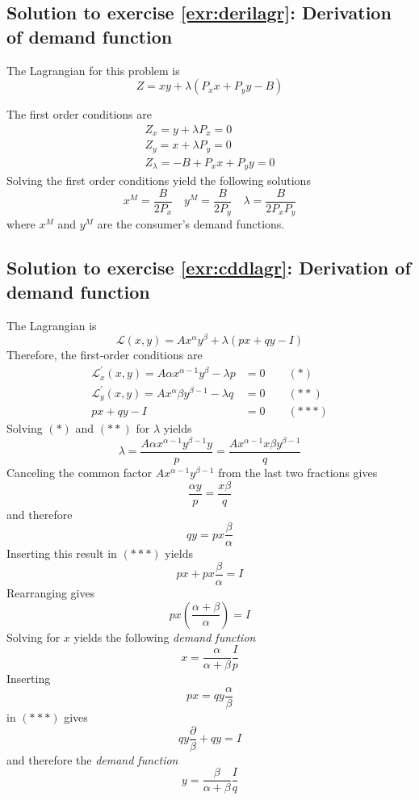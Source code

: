 \documentclass[
  12pt,
  oneside]{book}
\theoremstyle{definition}
\theoremstyle{definition}
\theoremstyle{definition}
\theoremstyle{definition}
\theoremstyle{remark}
\begin{document}
\hypertarget{sol:derilagr}{%
\subsection*{Solution to exercise \ref{exr:derilagr}: Derivation of demand function}\label{sol:derilagr}}

The Lagrangian for this problem is
\[
Z=x y+\lambda\left(P_{x} x+P_{y} y-B\right)
\]

The first order conditions are
\[\begin{array}{l}
        Z_{x}=y+\lambda P_{x}=0 \\
        Z_{y}=x+\lambda P_{y}=0 \\
        Z_{\lambda}=-B+P_{x} x+P_{y} y=0
    \end{array}
\]
Solving the first order conditions yield the following solutions
\[
    x^{M}=\frac{B}{2 P_{x}} \quad y^{M}=\frac{B}{2 P_{y}} \quad \lambda=\frac{B}{2 P_{x} P_{y}}
\]
where \(x^{M}\) and \(y^{M}\) are the consumer's demand functions.

\hypertarget{sol:cddlagr}{%
\subsection*{Solution to exercise \ref{exr:cddlagr}: Derivation of demand function}\label{sol:cddlagr}}

The Lagrangian is
\[
\mathcal{L}(x, y)=A x^{\alpha} y^{\beta}+\lambda(p x+q y-I)
\]
Therefore, the first-order conditions are
\[
\begin{aligned}
    \mathcal{L}_{x}^{\prime}(x, y)=A \alpha x^{\alpha-1} y^{\beta}-\lambda p &=0 \qquad (*)\\
    \mathcal{L}_{y}^{\prime}(x, y)=A x^{\alpha} \beta y^{\beta-1}-\lambda q &=0  \qquad (**)\\
    p x+q y-I &=0  \qquad (***)
\end{aligned}
\]
Solving \((*)\) and \((**)\) for \(\lambda\) yields
\[
\lambda=\frac{A \alpha x^{\alpha-1} y^{\beta-1} y}{p}=\frac{A x^{\alpha-1} x \beta y^{\beta-1}}{q}
\]
Canceling the common factor \(A x^{\alpha-1} y^{\beta-1}\) from the last two fractions gives
\[
\frac{\alpha y}{p}=\frac{x \beta}{q}
\]
and therefore
\[
q y=p x \frac{\beta}{\alpha}
\]
Inserting this result in \((***)\) yields
\[
p x+p x \frac{\beta}{\alpha}=I
\]
Rearranging gives
\[
p x\left(\frac{\alpha+\beta}{\alpha}\right)=I
\]
Solving for \(x\) yields the following \textit{demand function}
\[
x=\frac{\alpha}{\alpha+\beta} \frac{I}{p}
\]
Inserting
\[
p x=q y \frac{\alpha}{\beta}
\]
in \((***)\) gives
\[
q y \frac{\partial}{\beta}+q y=I
\]
and therefore the \textit{demand function}
\[
y=\frac{\beta}{\alpha+\beta}  \frac{I}{q}
\]
\end{document}
